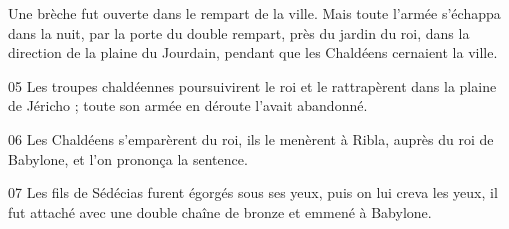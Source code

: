 
Une brèche fut ouverte dans le rempart de la ville. Mais toute l’armée s’échappa dans la nuit, par la porte du double rempart, près du jardin du roi, dans la direction de la plaine du Jourdain, pendant que les Chaldéens cernaient la ville.

05 Les troupes chaldéennes poursuivirent le roi et le rattrapèrent dans la plaine de Jéricho ; toute son armée en déroute l’avait abandonné.

06 Les Chaldéens s’emparèrent du roi, ils le menèrent à Ribla, auprès du roi de Babylone, et l’on prononça la sentence.

07 Les fils de Sédécias furent égorgés sous ses yeux, puis on lui creva les yeux, il fut attaché avec une double chaîne de bronze et emmené à Babylone.
